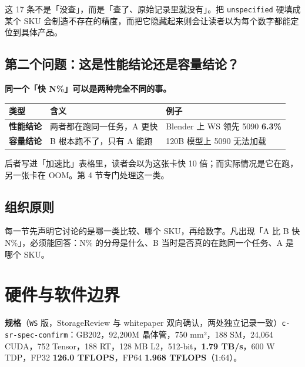 这 17 条不是「没查」，而是「查了、原始记录里就没有」。把 \texttt{unspecified} 硬填成某个 SKU 会制造不存在的精度，而把它隐藏起来则会让读者以为每个数字都能定位到具体产品。



\subsection{第二个问题：这是性能结论还是容量结论？}

\textbf{同一个「快 N\%」可以是两种完全不同的事。}


\begin{table}[t]
\centering
\footnotesize
\setlength{\tabcolsep}{4pt}
\label{tab:3}
\begin{tabularx}{\textwidth}{llX}
\toprule
类型 & 含义 & 例子 \\
\midrule
\textbf{性能结论} & 两者都在跑同一任务，A 更快 & Blender 上 WS 领先 5090 \textbf{6.3\%} \\
\textbf{容量结论} & B 根本跑不了，只有 A 能跑 & 120B 模型上 5090 无法加载 \\
\bottomrule
\end{tabularx}
\end{table}

后者写进「加速比」表格里，读者会以为这张卡快 10 倍；而实际情况是它在跑，另一张卡在 OOM。第 4 节专门处理这一类。


\subsection{组织原则}

每一节先声明它讨论的是哪一类比较、哪个 SKU，再给数字。凡出现「A 比 B 快 N\%」，必须能回答：N\% 的分母是什么、B 当时是否真的在跑同一个任务、A 是哪个 SKU。



\section{硬件与软件边界}

\textbf{规格}（\texttt{WS} 版，StorageReview 与 whitepaper 双向确认，两处独立记录一致）{\scriptsize\texttt{c-\hspace{0pt}sr-\hspace{0pt}spec-\hspace{0pt}confirm}}：GB202，92,200M 晶体管，750 mm²，188 SM，24,064 CUDA，752 Tensor，188 RT，128 MB L2，512-bit，\textbf{1.79 TB/s}，600 W TDP，FP32 \textbf{126.0 TFLOPS}，FP64 \textbf{1.968 TFLOPS}（1:64）。


